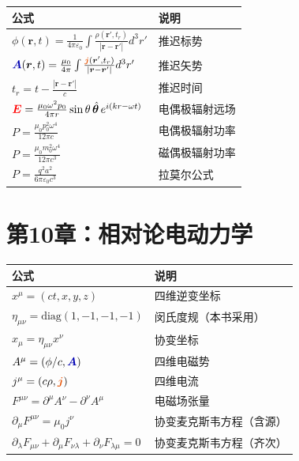\documentclass[11pt,a4paper,openany,oneside]{book}
\newcommand{\vecE}{\textcolor{red}{\vect{E}}}
\newcommand{\vecJ}{\textcolor{cororange}{\vect{j}}}
\newcommand{\vecA}{\textcolor{blue!70!black}{\vect{A}}}
\newcommand{\eps}{\varepsilon}
\newcommand{\muz}{\mu_0}
\newcommand{\vect}[1]{\bm{#1}}
\newcommand{\unitvec}[1]{\hat{\vect{#1}}}
\begin{document}
\begin{center}
\begin{tabular}{@{}ll@{}}
\toprule
\textbf{公式} & \textbf{说明} \\
\midrule
$\phi(\vect{r},t)=\frac{1}{4\pi\eps_0}\int\frac{\rho(\vect{r}',t_r)}{|\vect{r}-\vect{r}'|}d^3r'$ & 推迟标势 \\
$\vecA(\vect{r},t)=\frac{\muz}{4\pi}\int\frac{\vecJ(\vect{r}',t_r)}{|\vect{r}-\vect{r}'|}d^3r'$ & 推迟矢势 \\
$t_r=t-\frac{|\vect{r}-\vect{r}'|}{c}$ & 推迟时间 \\
$\vecE=\frac{\muz\omega^2 p_0}{4\pi r}\sin\theta\,\unitvec{\theta}\,e^{i(kr-\omega t)}$ & 电偶极辐射远场 \\
$P=\frac{\muz p_0^2\omega^4}{12\pi c}$ & 电偶极辐射功率 \\
$P=\frac{\muz m_0^2\omega^4}{12\pi c^3}$ & 磁偶极辐射功率 \\
$P=\frac{q^2 a^2}{6\pi\eps_0 c^3}$ & 拉莫尔公式 \\
\bottomrule
\end{tabular}
\end{center}

\section{第10章：相对论电动力学}

\begin{center}
\begin{tabular}{@{}ll@{}}
\toprule
\textbf{公式} & \textbf{说明} \\
\midrule
$x^\mu=(ct,x,y,z)$ & 四维逆变坐标 \\
$\eta_{\mu\nu}=\text{diag}(1,-1,-1,-1)$ & 闵氏度规（本书采用） \\
$x_\mu=\eta_{\mu\nu}x^\nu$ & 协变坐标 \\
$A^\mu=(\phi/c,\vecA)$ & 四维电磁势 \\
$j^\mu=(c\rho,\vecJ)$ & 四维电流 \\
$F^{\mu\nu}=\partial^\mu A^\nu-\partial^\nu A^\mu$ & 电磁场张量 \\
$\partial_\mu F^{\mu\nu}=\muz j^\nu$ & 协变麦克斯韦方程（含源） \\
$\partial_\lambda F_{\mu\nu}+\partial_\mu F_{\nu\lambda}+\partial_\nu F_{\lambda\mu}=0$ & 协变麦克斯韦方程（齐次） \\
\bottomrule
\end{tabular}
\end{center}
\end{document}
